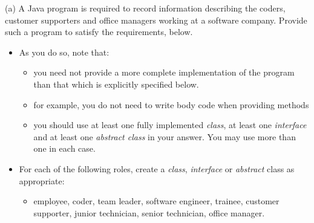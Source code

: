 \documentclass{exam}
\begin{document}
\begin{question}
\begin{roster}
\item[(a)]
A Java program is required to record information describing the coders, customer supporters and office managers working at a software company. Provide such a program to satisfy the requirements, below. 
\begin{itemize}
\item As you do so,  note that: 
\begin{itemize}
\item you need not provide a more complete implementation of the program than that which is explicitly specified  below.
\item for example, you do not need to write body code when providing methods
\item you should use at least one fully implemented \textit{class}, at least one \textit{interface} and at least one \textit{abstract class} in your answer. You may use more than one in each case.
\end{itemize}
\end{itemize}
\begin{itemize}
\item For each of the following roles, create a \textit{class}, \textit{interface} or \textit{abstract} class as appropriate: 
\begin{itemize}
\item employee, coder, team leader, software engineer, trainee, customer supporter, junior technician, senior technician, office manager.


\end{itemize}
\end{itemize}
\end{roster}
\end{question}
\end{document}
